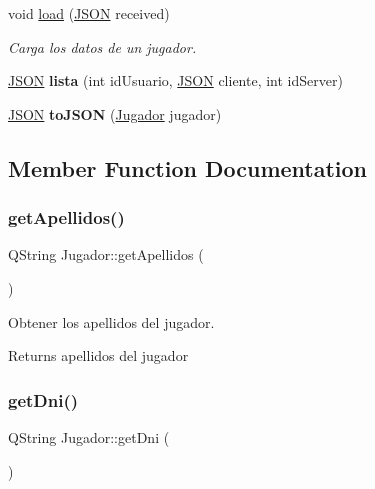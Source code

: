 \begin{DoxyCompactItemize}
void \mbox{\hyperlink{classJugador_ae2da8cec1afc1c566872dcc27f41e955}{load}} (\mbox{\hyperlink{jugador_8h_ab6104b89642419db4e355b7b2e40abbe}{J\+S\+ON}} received)
\begin{DoxyCompactList}\small\item\em Carga los datos de un jugador. \end{DoxyCompactList}\item 
\mbox{\label{classJugador_a0c7e8a139b10c0b077a553568f407057}} 
\mbox{\hyperlink{jugador_8h_ab6104b89642419db4e355b7b2e40abbe}{J\+S\+ON}} {\bfseries lista} (int id\+Usuario, \mbox{\hyperlink{jugador_8h_ab6104b89642419db4e355b7b2e40abbe}{J\+S\+ON}} cliente, int id\+Server)
\item 
\mbox{\label{classJugador_afa093cf63f9a65ed527f3da6431271d2}} 
\mbox{\hyperlink{jugador_8h_ab6104b89642419db4e355b7b2e40abbe}{J\+S\+ON}} {\bfseries to\+J\+S\+ON} (\mbox{\hyperlink{classJugador}{Jugador}} jugador)
\end{DoxyCompactItemize}


\subsection{Member Function Documentation}
\mbox{\label{classJugador_aba79aff8e870ffe04bf5a4ffd94f5e5d}} 
\subsubsection{\texorpdfstring{get\+Apellidos()}{getApellidos()}}
{\footnotesize\ttfamily Q\+String Jugador\+::get\+Apellidos (\begin{DoxyParamCaption}{ }\end{DoxyParamCaption})}



Obtener los apellidos del jugador. 

\begin{DoxyReturn}{Returns}
apellidos del jugador 
\end{DoxyReturn}
\mbox{\label{classJugador_abd65250f237f645c3f926e879b4740dd}} 
\subsubsection{\texorpdfstring{get\+Dni()}{getDni()}}
{\footnotesize\ttfamily Q\+String Jugador\+::get\+Dni (\begin{DoxyParamCaption}{ }\end{DoxyParamCaption})}



